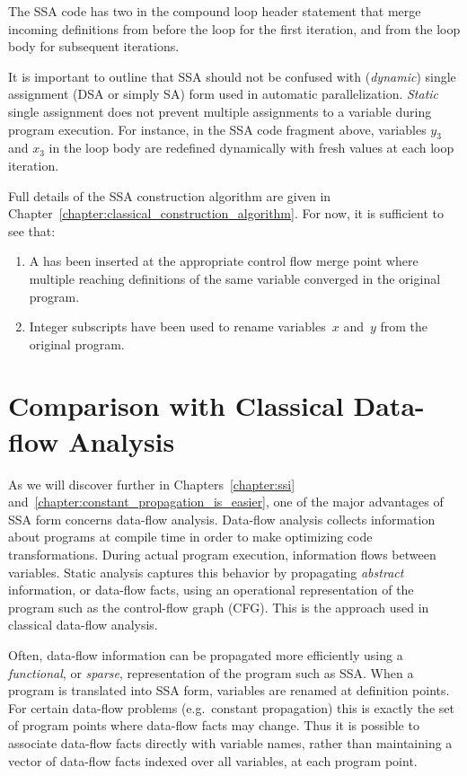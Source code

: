 The SSA code has two \phifuns in the compound loop header statement that merge incoming definitions from before the loop for the first iteration, and from the loop body for subsequent iterations.

It is important to outline that SSA should not be confused with (\emph{dynamic}) single assignment (DSA or simply SA) form used in automatic parallelization. 
\emph{Static} single assignment does not prevent multiple assignments to a variable during program execution. 
For instance, in the SSA code fragment above, variables $y_3$ and $x_3$ in the loop body are redefined dynamically with fresh values at each loop iteration.

Full details of the SSA construction algorithm are given in Chapter~\ref{chapter:classical_construction_algorithm}. 
For now, it is sufficient to see that: \begin{enumerate} \item A \phifun has been inserted at the appropriate control flow merge point where multiple reaching definitions of the same variable converged in the original program.
\item Integer subscripts have been used to rename variables~$x$ and~$y$ from the original program.
\end{enumerate}

\section{Comparison with Classical Data-flow Analysis} \label{sec:vanilla:dfa}
As we will discover further in Chapters~\ref{chapter:ssi} and~\ref{chapter:constant_propagation_is_easier}, one of the major advantages of SSA form concerns data-flow analysis. Data-flow analysis collects information about programs at compile time in order to make optimizing code transformations. 
During actual program execution, information flows between variables. 
Static analysis captures this behavior by propagating \textit{abstract} information, or data-flow facts, using an operational representation of the program such as the control-flow graph (CFG). 
This is the approach used in classical data-flow analysis.

Often, data-flow information can be propagated more efficiently using a \textit{functional}, or \textit{sparse}, representation of the program such as SSA. 
When a program is translated into SSA form, variables are renamed at definition points. 
For certain data-flow problems (e.g.~constant propagation) this is exactly the set of program points where data-flow facts may change. 
Thus it is possible to associate data-flow facts directly with variable names, rather than maintaining a vector of data-flow facts indexed over all variables, at each program point.

